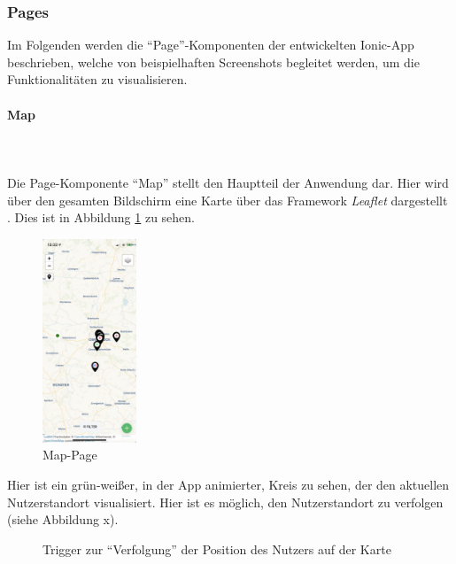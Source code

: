 \documentclass[a4paper, 11pt, DIV=11, listof=numbered, numbers=noenddot]{scrartcl}
\begin{document}
	\subsubsection{Pages}
	Im Folgenden werden die \enquote{Page}-Komponenten der entwickelten Ionic-App beschrieben, welche von beispielhaften Screenshots begleitet werden, um die Funktionalitäten zu visualisieren.
	
	\paragraph{Map}
	\textbf{}\\
	\textbf{}\\
	Die Page-Komponente \enquote{Map} stellt den Hauptteil der Anwendung dar.
	Hier wird über den gesamten Bildschirm eine Karte über das Framework \textit{Leaflet} dargestellt \cite{@Leaflet}.
	Dies ist in Abbildung \ref{fig:app-map} zu sehen.
	\begin{figure}[!htbp]
		\centering
		\includegraphics[width=0.25\textwidth]{img/app/map.png}
		\caption{Map-Page}\label{fig:app-map}
	\end{figure}
	Hier ist ein grün-weißer, in der App animierter, Kreis zu sehen, der den aktuellen Nutzerstandort visualisiert. Hier ist es möglich, den Nutzerstandort zu verfolgen (siehe Abbildung x).
	\begin{figure}[!htbp]
		\centering
		\hfill%
		\hfill%
		\caption{Trigger zur \enquote{Verfolgung} der Position des Nutzers auf der Karte}\label{fig:app-map-track-user}
	\end{figure}
\end{document}
